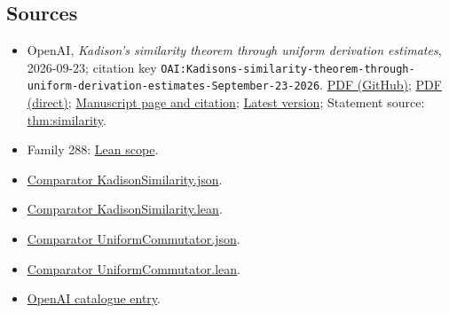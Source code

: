 \documentclass[11pt]{article}
\begin{document}
\subsection{Sources}
\begin{itemize}
\item OpenAI, \emph{Kadison's similarity theorem through uniform derivation estimates}, 2026-09-23; citation key \texttt{OAI:Kadisons-similarity-theorem-through-uniform-derivation-estimates-September-23-2026}. \href{https://github.com/openai/math/blob/adc7f1241b42e322a6451854ab7e4b4c146bf78a/preprints/Kadisons-similarity-theorem-through-uniform-derivation-estimates-September-23-2026/paper.pdf}{PDF (GitHub)}; \href{https://github.com/openai/math/raw/adc7f1241b42e322a6451854ab7e4b4c146bf78a/preprints/Kadisons-similarity-theorem-through-uniform-derivation-estimates-September-23-2026/paper.pdf}{PDF (direct)}; \href{https://github.com/openai/math/blob/adc7f1241b42e322a6451854ab7e4b4c146bf78a/preprints/Kadisons-similarity-theorem-through-uniform-derivation-estimates-September-23-2026/README.md}{Manuscript page and citation}; \href{https://github.com/openai/math/blob/main/preprints/Kadisons-similarity-theorem-through-uniform-derivation-estimates-September-23-2026/paper.pdf}{Latest version}; Statement source: \href{https://github.com/openai/math/blob/adc7f1241b42e322a6451854ab7e4b4c146bf78a/preprints/Kadisons-similarity-theorem-through-uniform-derivation-estimates-September-23-2026/build/sections/introduction.tex\#L15}{thm:similarity}.
\item Family 288: \href{https://github.com/openai/math/blob/adc7f1241b42e322a6451854ab7e4b4c146bf78a/lean/docs/288.md}{Lean scope}.
\item \href{https://github.com/openai/math/blob/adc7f1241b42e322a6451854ab7e4b4c146bf78a/lean/ComparatorChallenges/KadisonSimilarity.json}{Comparator KadisonSimilarity.json}.
\item \href{https://github.com/openai/math/blob/adc7f1241b42e322a6451854ab7e4b4c146bf78a/lean/ComparatorChallenges/KadisonSimilarity.lean}{Comparator KadisonSimilarity.lean}.
\item \href{https://github.com/openai/math/blob/adc7f1241b42e322a6451854ab7e4b4c146bf78a/lean/ComparatorChallenges/UniformCommutator.json}{Comparator UniformCommutator.json}.
\item \href{https://github.com/openai/math/blob/adc7f1241b42e322a6451854ab7e4b4c146bf78a/lean/ComparatorChallenges/UniformCommutator.lean}{Comparator UniformCommutator.lean}.
\item \href{https://github.com/openai/math/blob/adc7f1241b42e322a6451854ab7e4b4c146bf78a/CONTENTS.md}{OpenAI catalogue entry}.
\end{itemize}
\end{document}
